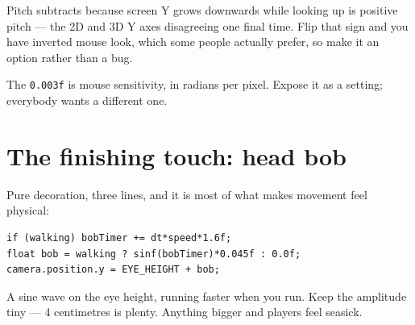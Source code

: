 Pitch subtracts because screen Y grows downwards while looking up is positive
pitch --- the 2D and 3D Y axes disagreeing one final time. Flip that sign and you
have inverted mouse look, which some people actually prefer, so make it an
option rather than a bug.

The \lstinline|0.003f| is mouse sensitivity, in radians per pixel. Expose it as a
setting; everybody wants a different one.

\section{The finishing touch: head bob}

Pure decoration, three lines, and it is most of what makes movement feel
physical:

\begin{lstlisting}
if (walking) bobTimer += dt*speed*1.6f;
float bob = walking ? sinf(bobTimer)*0.045f : 0.0f;
camera.position.y = EYE_HEIGHT + bob;
\end{lstlisting}

A sine wave on the eye height, running faster when you run. Keep the amplitude
tiny --- 4 centimetres is plenty. Anything bigger and players feel seasick.

